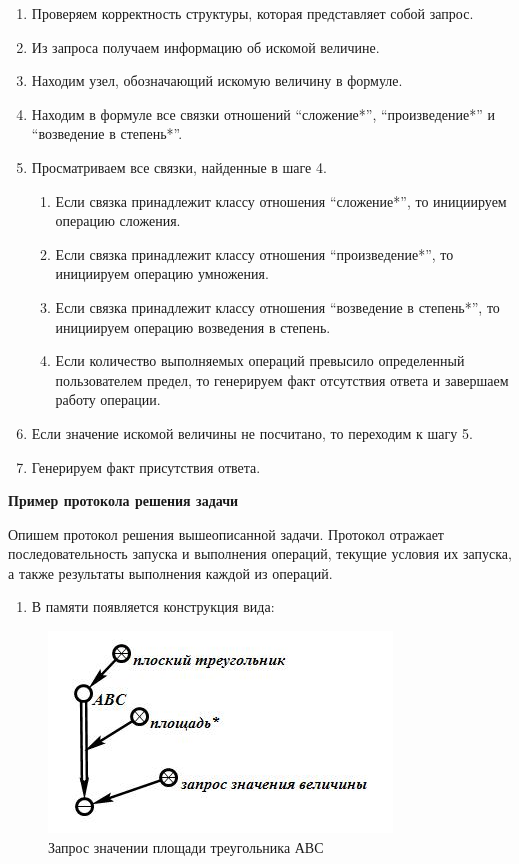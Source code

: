\begin{enumerate}
	\item
	Проверяем корректность структуры, которая представляет собой запрос.
	\item
	Из запроса получаем информацию об искомой величине.
	\item
	Находим узел, обозначающий искомую величину в формуле.
	\item
	Находим в формуле все связки отношений ``сложение*'', ``произведение*'' и ``возведение в степень*''.
	\item
	Просматриваем все связки, найденные в шаге 4.
	
	\begin{enumerate}
		\def\labelenumii{\arabic{enumii}.}
		\item
		Если связка принадлежит классу отношения ``сложение*'', то инициируем операцию сложения.
		\item
		Если связка принадлежит классу отношения ``произведение*'', то инициируем операцию умножения.
		\item
		Если связка принадлежит классу отношения ``возведение в степень*'', то инициируем операцию возведения в степень.
		\item
		Если количество выполняемых операций превысило определенный пользователем предел, то генерируем факт отсутствия ответа и завершаем работу операции.
	\end{enumerate}
	\item
	Если значение искомой величины не посчитано, то переходим к шагу 5.
	\item
	Генерируем факт присутствия ответа.
\end{enumerate}

\textbf{Пример протокола решения задачи}

Опишем протокол решения вышеописанной задачи. Протокол отражает последовательность запуска и выполнения операций, текущие условия их запуска, а также результаты выполнения каждой из операций.

\begin{enumerate}
	\item
	В памяти появляется конструкция вида:
\end{enumerate}

\begin{figure}[H]
	\includegraphics[scale=0.5]{images/part7/chapter_learning_systems/step2.jpg}
	\caption{Запрос значении площади треугольника АВС}
	\label{fig:step2}
\end{figure}

